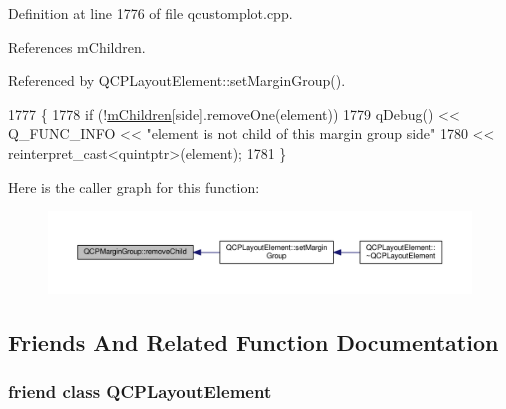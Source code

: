 Definition at line 1776 of file qcustomplot.\+cpp.



References m\+Children.



Referenced by Q\+C\+P\+Layout\+Element\+::set\+Margin\+Group().


\begin{DoxyCode}
1777                                                             \{
1778   \textcolor{keywordflow}{if} (!\hyperlink{class_q_c_p_margin_group_ac16957e388687100bfd10f68fb7baac8}{mChildren}[side].removeOne(element))
1779     qDebug() << Q\_FUNC\_INFO << \textcolor{stringliteral}{"element is not child of this margin group side"}
1780              << \textcolor{keyword}{reinterpret\_cast<}quintptr\textcolor{keyword}{>}(element);
1781 \}
\end{DoxyCode}


Here is the caller graph for this function\+:\nopagebreak
\begin{figure}[H]
\begin{center}
\leavevmode
\includegraphics[width=350pt]{class_q_c_p_margin_group_a20ab3286062957d99b58db683fe725b0_icgraph}
\end{center}
\end{figure}




\subsection{Friends And Related Function Documentation}
\hypertarget{class_q_c_p_margin_group_a0790750c7e7f14fdbd960d172655b42b}{}
\subsubsection[{Q\+C\+P\+Layout\+Element}]{\setlength{\rightskip}{0pt plus 5cm}friend class {\bf Q\+C\+P\+Layout\+Element}\hspace{0.3cm}{\ttfamily [friend]}}\label{class_q_c_p_margin_group_a0790750c7e7f14fdbd960d172655b42b}


